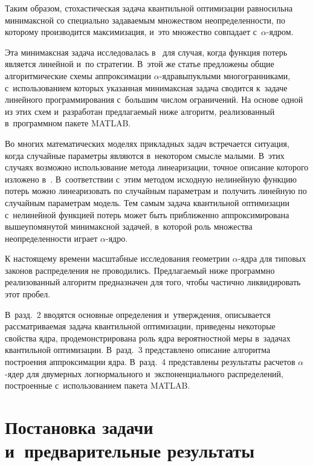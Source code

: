\begin{multicols}{2}
Таким образом, сто\-ха\-сти\-че\-ская задача квантильной оптимизации равносильна 
минимаксной со специально за\-да\-ва\-емым множеством неопределенности, по 
которому производится максимизация, и~это множество совпадает с~$\alpha$-яд\-ром. 

Эта минимаксная задача исследовалась в~\cite{vaskan} для случая, когда функция 
потерь является линейной и~по стратегии. В~этой же статье предложены общие 
алгоритмические схемы аппроксимации $\alpha$-яд\-ра\linebreak выпуклы\-ми многогранниками, 
с~использованием которых указанная минимаксная задача сводится к~задаче 
линейного программирования с~большим чис\-лом ограничений. 
%
На основе одной 
из этих схем и~разработан пред\-ла\-га\-емый ниже алгоритм, реализованный в~программном 
пакете MATLAB.

Во многих математических моделях прикладных задач встречается ситуация, 
когда случайные па\-ра\-мет\-ры являются в~некотором смысле малыми. В~этих случаях 
возможно использование метода линеаризации, точ\-ное описание которого изложено 
в~\cite{vaskan2}. В~соответствии с~этим методом исходную нелинейную функцию 
потерь можно линеаризовать по случайным па\-ра\-мет\-рам и~получить линейную по 
случайным па\-ра\-мет\-рам модель. Тем самым задача квантильной оптимизации с~нелинейной 
функцией потерь может быть приближенно аппроксимирована вышеупомянутой ми\-ни\-макс\-ной 
задачей, в~которой роль множества не\-опре\-де\-лен\-ности играет $\alpha$-ядро.

К настоящему времени мас\-штаб\-ные исследования гео\-мет\-рии $\alpha$-яд\-ра 
для типовых законов распределения не проводились. Предлагаемый ниже 
программно реализованный алгоритм предназначен для того, чтобы час\-тич\-но 
ликвидировать этот пробел.


В~разд.~2 вводятся основные определения и~утверж\-де\-ния, описывается 
рас\-смат\-ри\-ва\-емая задача кван\-тиль\-ной оптимизации, приведены некоторые свойства ядра, 
продемонстрирована роль ядра вероятностной меры в~задачах квантильной оптимизации. 
В~разд.~3 пред\-став\-ле\-но описание алгоритма по\-стро\-ения аппроксимации ядра. В~разд.~4 
представлены результаты рас\-че\-тов $\alpha$-ядер для двумерных логнормального 
и~экспоненциального рас\-пре\-де\-ле\-ний, по\-стро\-ен\-ные с~использованием пакета MATLAB.


\section{Постановка задачи и~предварительные результаты}


\end{multicols}

